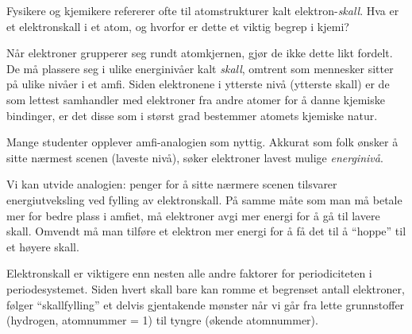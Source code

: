

Fysikere og kjemikere refererer ofte til atomstrukturer kalt elektron-{\it skall}. Hva er et elektronskall i et atom, og hvorfor er dette et viktig begrep i kjemi?







Når elektroner grupperer seg rundt atomkjernen, gjør de ikke dette likt fordelt. De må plassere seg i ulike energinivåer kalt {\it skall}, omtrent som mennesker sitter på ulike nivåer i et amfi. Siden elektronene i ytterste nivå (ytterste skall) er de som lettest samhandler med elektroner fra andre atomer for å danne kjemiske bindinger, er det disse som i størst grad bestemmer atomets kjemiske natur.

\vskip 10pt

Mange studenter opplever amfi-analogien som nyttig. Akkurat som folk ønsker å sitte nærmest scenen (laveste nivå), søker elektroner lavest mulige {\it energinivå}.

Vi kan utvide analogien: penger for å sitte nærmere scenen tilsvarer energiutveksling ved fylling av elektronskall. På samme måte som man må betale mer for bedre plass i amfiet, må elektroner avgi mer energi for å gå til lavere skall. Omvendt må man tilføre et elektron mer energi for å få det til å ``hoppe'' til et høyere skall.







Elektronskall er viktigere enn nesten alle andre faktorer for periodiciteten i periodesystemet. Siden hvert skall bare kan romme et begrenset antall elektroner, følger ``skallfylling'' et delvis gjentakende mønster når vi går fra lette grunnstoffer (hydrogen, atomnummer = 1) til tyngre (økende atomnummer).



